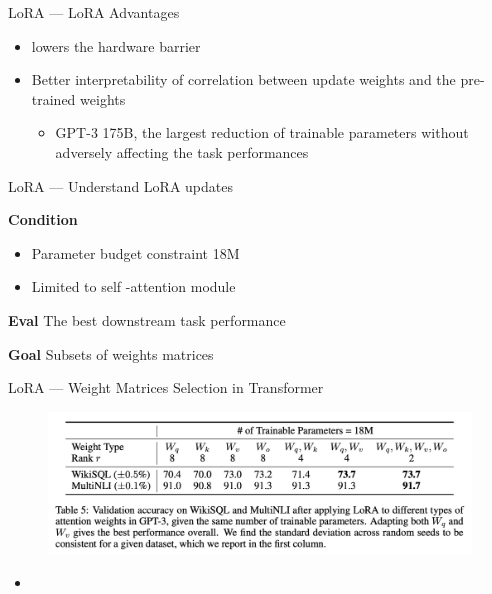 \documentclass[aspectratio=169,xcolor=dvipsnames]{beamer}
\begin{document}

\begin{frame}{LoRA --- LoRA Advantages}
    \begin{itemize}
        \item lowers the hardware barrier
        \item Better interpretability of correlation between update weights and the pre-trained weights
        \begin{itemize}
            \item GPT-3 175B, the largest reduction of trainable parameters without adversely affecting the task performances
        \end{itemize}
    \end{itemize}
\end{frame}


\begin{frame}{LoRA --- Understand LoRA updates}
    

    \textbf{Condition}
    \begin{itemize}
        \item Parameter budget constraint 18M
        \item Limited to self -attention module
    \end{itemize}
    \textbf{Eval} The best downstream task performance

    \textbf{Goal} Subsets of weights matrices
\end{frame}


\begin{frame}{LoRA --- Weight Matrices Selection in Transformer}
    \begin{figure}
        \centering
        \label{budget_parameter}
        \includegraphics[width=0.8 \linewidth]{figures/budget_parameter.png}
    \end{figure} 
    \begin{itemize}
        \item 
    \end{itemize} 
\end{frame}
\end{document}
